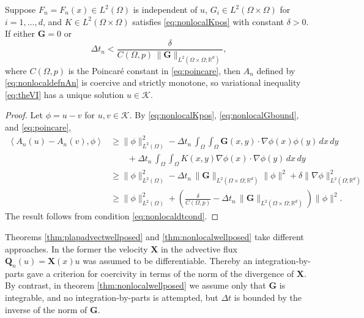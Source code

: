 \documentclass[final,leqno,onefignum,onetabnum]{siamltex1213bueler}
\newcommand\bG{\mathbf{G}}
\newcommand\bQ{\mathbf{Q}}
\newcommand\bX{\mathbf{X}}
\renewcommand{\grad}{\nabla}
\newcommand{\ip}[2]{\ensuremath{\left<#1,#2\right>}}
\newcommand\RR{\mathbb{R}}
\begin{document}
\begin{theorem}  \label{thm:nonlocalwellposed}  Suppose $F_n=F_n(x) \in L^2(\Omega)$ is independent of $u$, $G_i \in L^2(\Omega\times\Omega)$ for $i=1,\dots,d$, and $K \in L^2(\Omega\times\Omega)$ satisfies \eqref{eq:nonlocalKpos} with constant $\delta >0$.  If either $\bG=0$ or
\begin{equation}
  \Delta t_n < \frac{\delta}{C(\Omega,p)\, \|\bG\|_{L^2(\Omega\times\Omega;\RR^d)}},  \label{eq:nonlocaldtcond}
\end{equation}
where $C(\Omega,p)$ is the Poincar\'e constant in \eqref{eq:poincare}, then $A_n$ defined by \eqref{eq:nonlocaldefnAn} is coercive and strictly monotone, so variational inequality \eqref{eq:theVI} has a unique solution $u\in\mathcal{K}$.
\end{theorem}

\begin{proof}  Let $\phi=u-v$ for $u,v\in\mathcal{K}$.  By \eqref{eq:nonlocalKpos}, \eqref{eq:nonlocalGbound}, and \eqref{eq:poincare},
\begin{align*}
\ip{A_n(u)-A_n(v)}{\phi} &\ge \|\phi\|_{L^2(\Omega)}^2 - \Delta t_n\,\int_\Omega \int_\Omega \bG(x,y) \cdot \grad \phi(x) \phi(y)\,dx\,dy \\
    &\qquad + \Delta t_n\,\int_\Omega \int_\Omega K(x,y) \grad \phi(x) \cdot \grad \phi(y)\,dx\,dy \\
    &\ge \|\phi\|_{L^2(\Omega)}^2 - \Delta t_n\,\|\bG\|_{L^2(\Omega\times\Omega;\RR^d)} \|\phi\|^2 + \delta \|\grad\phi\|_{L^2(\Omega;\RR^d)}^2 \\
    &\ge \|\phi\|_{L^2(\Omega)}^2 + \left(\frac{\delta}{C(\Omega,p)} - \Delta t_n\,\|\bG\|_{L^2(\Omega\times\Omega;\RR^d)}\right) \|\phi\|^2.
\end{align*}
The result follows from condition \eqref{eq:nonlocaldtcond}.
\end{proof}

Theorems \ref{thm:plapadvectwellposed} and \ref{thm:nonlocalwellposed} take different approaches.  In the former the velocity $\bX$ in the advective flux $\bQ_n(u) = \bX(x) u$ was assumed to be differentiable.  Thereby an integration-by-parts gave a criterion for coercivity in terms of the norm of the divergence of $\bX$.  By contrast, in theorem \ref{thm:nonlocalwellposed} we assume only that $\bG$ is integrable, and no integration-by-parts is attempted, but $\Delta t$ is bounded by the inverse of the norm of $\bG$.
\end{document}
